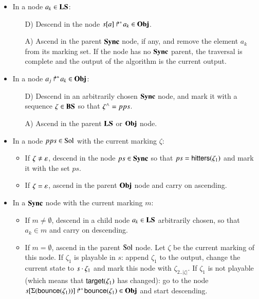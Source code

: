 \begin{itemize}
  \item In a node $a_k \in \mathbf{LS}$:
    \begin{itemize}
      \item[D)] Descend in the node $\mbox{${s[a]}\Rsh^*\!a_k$} \in \mathbf{Obj}$.
      \item[A)] Ascend in the parent $\mathbf{Sync}$ node, if any,
        and remove the element $a_k$ from its marking set.
        If the node has no $\mathbf{Sync}$ parent, the traversal is complete
        and the output of the algorithm is the current output.
    \end{itemize}
  
  \item In a node $\mbox{$a_j\Rsh^*\!a_k$} \in \mathbf{Obj}$:
    \begin{itemize}
      \item[D)] Descend in an arbitrarily chosen $\mathbf{Sync}$ node,
        and mark it with a sequence $\zeta \in \mathbf{BS}$ so that $\zeta^\wedge = pps$.
      \item[A)] Ascend in the parent $\mathbf{LS}$ or $\mathbf{Obj}$ node.
    \end{itemize}
  
  \item In a node $pps \in \mathrm{Sol}$ with the current marking $\zeta$:
    \begin{itemize}
      \item If $\zeta \neq \varepsilon$,
        descend in the node $ps \in \mathbf{Sync}$
        so that $ps = \mathsf{hitters}(\zeta_1)$
        and mark it with the set $ps$.
      \item If $\zeta = \varepsilon$,
        ascend in the parent $\mathbf{Obj}$ node and carry on ascending.
    \end{itemize}
  
  \item In a $\mathbf{Sync}$ node with the current marking $m$:
    \begin{itemize}
      \item If $m \neq \emptyset$,
        descend in a child node $a_k \in \mathbf{LS}$ arbitrarily chosen,
        so that $a_k \in m$ and carry on descending.
      \item If $m = \emptyset$,
        ascend in the parent $\mathrm{Sol}$ node.
        Let $\zeta$ be the current marking of this node.
        If $\zeta_1$ is playable in $s$:
          append $\zeta_1$ to the output,
          change the current state to $s \cdot \zeta_1$
          and mark this node with $\zeta_{2..|\zeta|}$.
        If $\zeta_1$ is not playable
        (which means that $\mathsf{target}(\zeta_1)$ has changed):
          go to the node $\mbox{${s[\Sigma(\mathsf{bounce}(\zeta_1))]}\Rsh^*\!\mathsf{bounce}(\zeta_1)$} \in \mathbf{Obj}$
          and start descending.
    \end{itemize}
\end{itemize}



